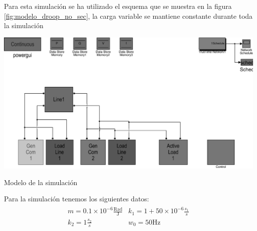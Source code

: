 \documentclass{tufte-handout}
\begin{document}
 Para esta simulación se ha utilizado el esquema que se muestra en la figura \ref{fig:modelo_droop_no_sec}, la carga variable se mantiene constante durante toda la simulación 
\begin{marginfigure}%
  \includegraphics[width=\linewidth]{modelo_no_comm_no_sec}
  \caption{Modelo de la simulación}
  \label{fig:modelo_droop_no_sec}
\end{marginfigure}

 Para la simulación tenemos los siguientes datos:
 \begin{align}
     \begin{matrix}
         m=0.1\times10^{-6}\frac{\text{Rad}}{\text{J}} & k_1=1+50\times 10^{-6}\frac{s_1}{s}\\
         k_2=1\frac{s_2}{s} & w_0=50\text{Hz}  
     \end{matrix}
 \end{align}
\end{document}
